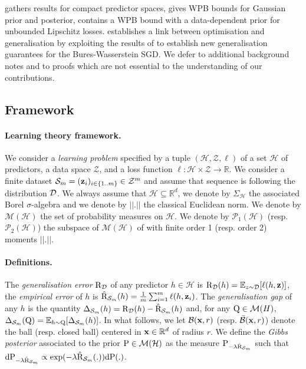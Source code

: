  gathers results for compact predictor spaces,  gives WPB bounds for Gaussian prior and posterior,  contains a WPB bound with a data-dependent prior for unbounded Lipschitz losses.  establishes a link between optimisation and generalisation by exploiting the results of \citet{lambert2022variational} to establish new generalisation guarantees for the Bures-Wasserstein SGD. We defer to  additional background notes and to  proofs which are not essential to the understanding of our contributions.


\subsection{Framework}
\label{sec: framework}

\paragraph{Learning theory framework.}
We consider a \emph{learning problem} specified by a tuple $(\mathcal{H}, \mathcal{Z}, \ell)$ of a set $\mathcal{H}$ of predictors, a data space $\mathcal{Z}$, and a loss function $\ell : \mathcal{H}\times \mathcal{Z} \rightarrow \mathbb{R} $.
We consider a finite dataset $\Sm=(\z_i)_{i\in \{1..m\}}\in\mathcal{Z}^{m}$ and assume that sequence is \iid following the distribution $\D$. We always assume that $\mathcal{H}\subseteq\mathbb{R}^d$, we denote by $\Sigma_{\mathcal{H}}$ the associated Borel $\sigma$-algebra and we denote by $||.||$ the classical Euclidean norm. We denote by $\mathcal{M}(\mathcal{H})$ the set of probability measures on $\mathcal{H}$.
We denote by $\mathcal{P}_1(\mathcal{H})$ (resp. $\mathcal{P}_2(\mathcal{H})$) the subspace of $\mathcal{M}(\mathcal{H})$ of with finite order 1 (resp. order 2) moments \wrt $||.||$.

\paragraph{Definitions.}
The \emph{generalisation error} $\Risk_{\D}$ of any predictor $h\in\mathcal{H}$ is $\Risk_{\D}(h)= \mathbb{E}_{z\sim \D}[\ell(h,\z)]$, the \emph{empirical error} of $h$ is $\Riskhat_{\Sm}(h)= \frac{1}{m}\sum_{i=1}^m\ell(h,\z_i)$.
The \emph{generalisation gap} of any $h$ is the quantity $\Delta_{\Sm}(h)=\Risk_{\D}(h)-\Riskhat_{\Sm}(h)$ and, for any $\Q\in\mathcal{M}(H)$, $\Delta_{\Sm}(\Q)= \mathbb{E}_{h\sim \Q}[\Delta_{\Sm}(h)]$. In what follows, we let $\mathcal{B}(\x,r)$ (resp. $\bar{\mathcal{B}}(\x,r)$) denote the ball (resp. closed ball) centered in $\x\in\mathbb{R}^d$ of radius $r$.
We define the \emph{Gibbs posterior} associated to the prior $\P\in\mathcal{M}(\mathcal{H})$ as the measure $\P_{-\lambda \Riskhat_{\Sm}}$ such that $\mathrm{d}\P_{-\lambda \Riskhat_{\Sm}} \propto \exp(-\lambda \Riskhat_{\Sm}(.)) \mathrm{d}\P(.)$.



